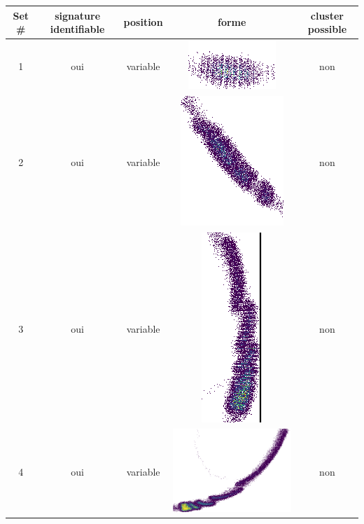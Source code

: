 \begin{table}[h]
\centering
\begin{tabular}{|c|c|c|c|c|}
\hline
Set \# & signature identifiable & position & forme & cluster possible\\
\hline
1 & oui & variable & \includegraphics[scale=0.2]{images/set1.png} & non \\
\hline
2 & oui & variable & \includegraphics[scale=0.2]{images/set2.png} & non \\
\hline
3 & oui & variable & \includegraphics[scale=0.2]{images/set3.png} & non \\
\hline
4 & oui & variable & \includegraphics[scale=0.2]{images/set4.png} & non \\

\end{tabular}
\end{table}

